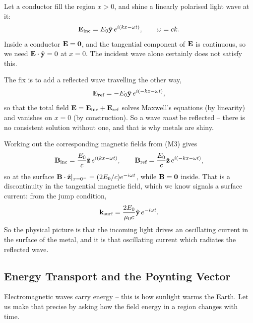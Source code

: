 \documentclass[a4paper]{scrartcl}
\newcommand{\hh}[1]{\hat{\vv{#1}}}
\begin{document}
\begin{example}
	Let a conductor fill the region $x>0$, and shine a linearly polarised light wave at it:
	$$
	\vv{E}_{\text{inc}} = E_0 \hh{y}\, e^{i(kx - \omega t)}, \qquad \omega = ck.
	$$
	Inside a conductor $\mathbf{E} = \mathbf{0}$, and the tangential component of $\mathbf{E}$ is continuous, so we need $\vv{E}\cdot\hh{y} = 0$ at $x = 0$. The incident wave alone certainly does not satisfy this.

	The fix is to add a reflected wave travelling the other way,
	$$
	\vv{E}_{\text{ref}} = -E_0\hh{y}\, e^{i(-kx-\omega t)},
	$$
	so that the total field $\mathbf{E} = \mathbf{E}_{\text{inc}} + \mathbf{E}_{\text{ref}}$ solves Maxwell's equations (by linearity) and vanishes on $x = 0$ (by construction). So a wave \emph{must} be reflected -- there is no consistent solution without one, and that is why metals are shiny.

	Working out the corresponding magnetic fields from (M3) gives
	$$
	\vv{B}_{\text{inc}} = \frac{E_0}{c}\hh{z}\,e^{i(kx-\omega t)}, \qquad \vv{B}_{\text{ref}} = \frac{E_0}{c}\hh{z}\,e^{i(-kx-\omega t)},
	$$
	so at the surface $\vv{B}\cdot\hh{z}|_{x = 0^-} = (2E_0/c)e^{-i\omega t}$, while $\mathbf{B} = \mathbf{0}$ inside. That is a discontinuity in the tangential magnetic field, which we know signals a surface current: from the jump condition,
	$$
	\vv{k}_{\text{surf}} = \frac{2E_0}{\mu_0 c}\hh{y}\, e^{-i\omega t}.
	$$
	So the physical picture is that the incoming light drives an oscillating current in the surface of the metal, and it is that oscillating current which radiates the reflected wave.
\end{example}

\subsection{Energy Transport and the Poynting Vector}

Electromagnetic waves carry energy -- this is how sunlight warms the Earth. Let us make that precise by asking how the field energy in a region changes with time.
\end{document}
